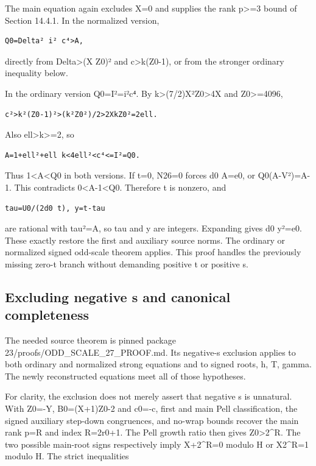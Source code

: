 \documentclass[
  10pt,
]{article}
\begin{document}
The main equation again excludes X=0 and supplies the rank
p\textgreater=3 bound of Section 14.4.1. In the normalized version,

\begin{verbatim}
Q0=Delta² i² c⁴>A,
\end{verbatim}

directly from Delta\textgreater(X Z0)² and
\textbar c\textbar\textgreater k(Z0-1), or from the stronger ordinary
inequality below.

In the ordinary version Q0=I²=i²c⁴. By
k\textgreater(7/2)X²Z0\textgreater4X and Z0\textgreater=4096,

\begin{verbatim}
c²>k²(Z0-1)²>(k²Z0²)/2>2XkZ0²=2ell.
\end{verbatim}

Also ell\textgreater k\textgreater=2, so

\begin{verbatim}
A=1+ell²+ell k<4ell²<c⁴<=I²=Q0.
\end{verbatim}

Thus 1\textless A\textless Q0 in both versions. If t=0, N26=0 forces d0
A=e0, or Q0(A-V²)=A-1. This contradicts 0\textless A-1\textless Q0.
Therefore t is nonzero, and

\begin{verbatim}
tau=U0/(2d0 t), y=t-tau
\end{verbatim}

are rational with tau²=A, so tau and y are integers. Expanding gives d0
y²=e0. These exactly restore the first and auxiliary source norms. The
ordinary or normalized signed odd-scale theorem applies. This proof
handles the previously missing zero-t branch without demanding positive
t or positive s.

\subsection{Excluding negative s and canonical
completeness}\label{excluding-negative-s-and-canonical-completeness}

The needed source theorem is pinned package
23/proofs/ODD\_SCALE\_27\_PROOF.md. Its negative-s exclusion applies to
both ordinary and normalized strong equations and to signed roots,
h, T, gamma. The newly reconstructed equations meet all of those
hypotheses.

For clarity, the exclusion does not merely assert that negative s is
unnatural. With Z0=-Y, B0=(X+1)Z0-2 and c0=-c, first and main Pell
classification, the signed auxiliary step-down congruences, and no-wrap
bounds recover the main rank p=R and index R=2r0+1. The Pell growth
ratio then gives Z0\textgreater2\^{}R. The two possible main-root signs
respectively imply X+2\^{}R=0 modulo H or X2\^{}R=1 modulo H. The strict
inequalities
\end{document}
